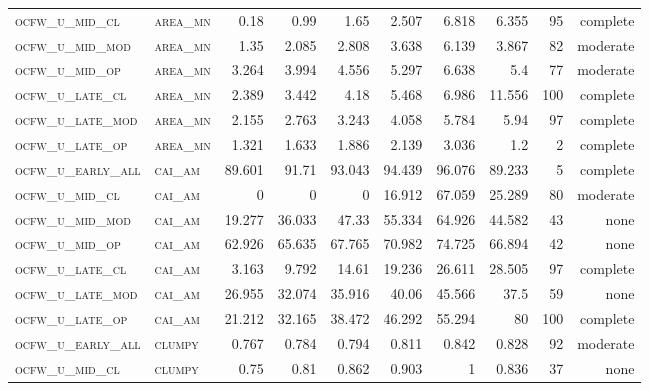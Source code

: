 \begin{landscape}
\begin{center}
\begin{footnotesize}
\begin{longtable}{llrrrrr|rrr}
\textsc{ocfw\_u\_mid\_cl   } & \textsc{area\_mn  }    & 0.18     & 0.99     & 1.65     & 2.507    & 6.818    & 6.355    & 95  & complete \\
\textsc{ocfw\_u\_mid\_mod  } & \textsc{area\_mn  }    & 1.35     & 2.085    & 2.808    & 3.638    & 6.139    & 3.867    & 82  & moderate \\
\textsc{ocfw\_u\_mid\_op   } & \textsc{area\_mn  }    & 3.264    & 3.994    & 4.556    & 5.297    & 6.638    & 5.4      & 77  & moderate \\
\textsc{ocfw\_u\_late\_cl  } & \textsc{area\_mn  }    & 2.389    & 3.442    & 4.18     & 5.468    & 6.986    & 11.556   & 100 & complete \\
\textsc{ocfw\_u\_late\_mod } & \textsc{area\_mn  }    & 2.155    & 2.763    & 3.243    & 4.058    & 5.784    & 5.94     & 97  & complete \\
\textsc{ocfw\_u\_late\_op  } & \textsc{area\_mn  }    & 1.321    & 1.633    & 1.886    & 2.139    & 3.036    & 1.2      & 2   & complete \\
\textsc{ocfw\_u\_early\_all} & \textsc{cai\_am   }    & 89.601   & 91.71    & 93.043   & 94.439   & 96.076   & 89.233   & 5   & complete \\
\textsc{ocfw\_u\_mid\_cl   } & \textsc{cai\_am   }    & 0        & 0        & 0        & 16.912   & 67.059   & 25.289   & 80  & moderate \\
\textsc{ocfw\_u\_mid\_mod  } & \textsc{cai\_am   }    & 19.277   & 36.033   & 47.33    & 55.334   & 64.926   & 44.582   & 43  & none     \\
\textsc{ocfw\_u\_mid\_op   } & \textsc{cai\_am   }    & 62.926   & 65.635   & 67.765   & 70.982   & 74.725   & 66.894   & 42  & none     \\
\textsc{ocfw\_u\_late\_cl  } & \textsc{cai\_am   }    & 3.163    & 9.792    & 14.61    & 19.236   & 26.611   & 28.505   & 97  & complete \\
\textsc{ocfw\_u\_late\_mod } & \textsc{cai\_am   }    & 26.955   & 32.074   & 35.916   & 40.06    & 45.566   & 37.5     & 59  & none     \\
\textsc{ocfw\_u\_late\_op  } & \textsc{cai\_am   }    & 21.212   & 32.165   & 38.472   & 46.292   & 55.294   & 80       & 100 & complete \\
\textsc{ocfw\_u\_early\_all} & \textsc{clumpy    }    & 0.767    & 0.784    & 0.794    & 0.811    & 0.842    & 0.828    & 92  & moderate \\
\textsc{ocfw\_u\_mid\_cl   } & \textsc{clumpy    }    & 0.75     & 0.81     & 0.862    & 0.903    & 1        & 0.836    & 37  & none     \\

\end{longtable}
\end{footnotesize}
\end{center}
\end{landscape}
